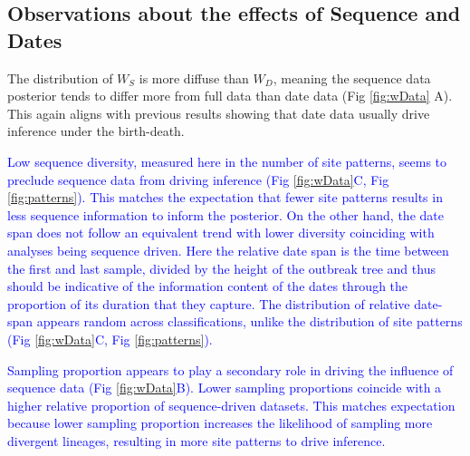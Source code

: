 \documentclass{article}
\begin{document}
\subsection*{Observations about the effects of Sequence and Dates}
The distribution of $W_S$ is more diffuse than $W_D$, meaning the sequence data posterior tends to differ more from full data than date data (Fig \ref{fig:wData} A). This again aligns with previous results showing that date data usually drive inference under the birth-death.

\textcolor{blue}{Low sequence diversity, measured here in the number of site patterns, seems to preclude sequence data from driving inference (Fig \ref{fig:wData}C, Fig \ref{fig:patterns}). This matches the expectation that fewer site patterns results in less sequence information to inform the posterior. On the other hand, the date span  does not follow an equivalent trend with lower diversity coinciding with analyses being sequence driven. Here the relative date span is the time between the first and last sample, divided by the height of the outbreak tree and thus should be indicative of the information content of the dates \textcolor{blue}{through the proportion of its duration that they capture}. The distribution of relative date-span appears random across classifications, unlike the distribution of site patterns (Fig \ref{fig:wData}C, Fig \ref{fig:patterns}).}

\textcolor{blue}{Sampling proportion appears to play a secondary role in driving the influence of sequence data (Fig \ref{fig:wData}B). Lower sampling proportions coincide with a higher relative proportion of sequence-driven datasets. This matches expectation because lower sampling proportion increases the likelihood of sampling more divergent lineages, resulting in more site patterns to drive inference.}
\end{document}
